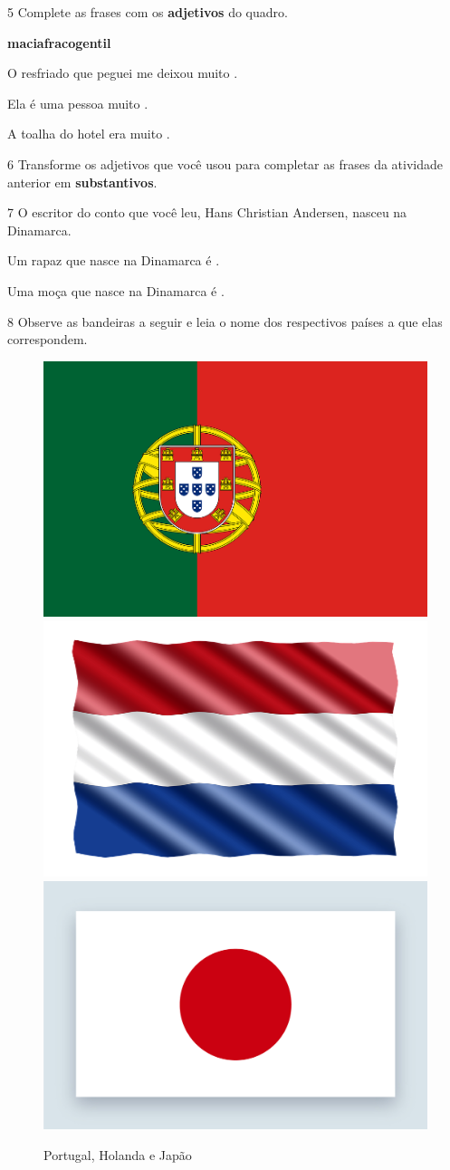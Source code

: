 \num{5} Complete as frases com os \textbf{adjetivos} do quadro.

\begin{mdframed}[linewidth=2pt,linecolor=salmao,roundcorner=10pt]
\textbf{macia}\hfill \textbf{fraco}\hfill \textbf{gentil}\hfill
\end{mdframed}

\begin{escolha}
\item O resfriado que peguei me deixou muito .

\item Ela é uma pessoa muito .

\item A toalha do hotel era muito .
\end{escolha}

\num{6} Transforme os adjetivos que você usou para completar as frases
da atividade anterior em \textbf{substantivos}.


\num{7} O escritor do conto que você leu, Hans Christian Andersen, nasceu na Dinamarca.

\begin{escolha}
\item Um rapaz que nasce na Dinamarca é .

\item Uma moça que nasce na Dinamarca é .
\end{escolha}\enlargethispage{\baselineskip}

\num{8} Observe as bandeiras a seguir e leia o nome dos respectivos países a que elas correspondem.

\begin{figure}[htpb!]
\includegraphics[width=.3\textwidth]{media/image3.png}
\includegraphics[width=.3\textwidth]{media/image4.png}
\includegraphics[width=.3\textwidth]{media/image5.jpeg}
\caption{Portugal, Holanda e Japão}
\end{figure}

